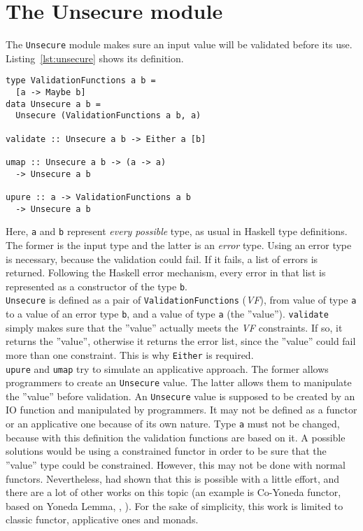 \section{The Unsecure module}\label{sec:usecure}
The \texttt{Unsecure} module makes sure an input value will be validated before its use. Listing~\ref{lst:unsecure} shows its definition.

\begin{lstlisting}[caption={Unsecure module}, label={lst:unsecure}]
type ValidationFunctions a b =
  [a -> Maybe b]
data Unsecure a b =  
  Unsecure (ValidationFunctions a b, a)
 
validate :: Unsecure a b -> Either a [b]

umap :: Unsecure a b -> (a -> a) 
  -> Unsecure a b

upure :: a -> ValidationFunctions a b
  -> Unsecure a b
\end{lstlisting}
Here, \texttt{a} and \texttt{b} represent \textit{every possible} type, as usual in Haskell type definitions. The former is the input type and the latter is an \textit{error} type. Using an error type is necessary, because the validation could fail. If it fails, a list of errors is returned. Following the Haskell error mechanism, every error in that list is represented as a constructor of the type \texttt{b}. \\
\texttt{Unsecure} is defined as a pair of \texttt{ValidationFunctions} (\textit{VF}), from value of type \texttt{a} to a value of an error type \texttt{b}, and a value of type \texttt{a} (the ''value''). \texttt{validate} simply makes sure that the ''value'' actually meets the \textit{VF} constraints. If so, it returns the ''value'', otherwise it returns the error list, since the ''value'' could fail more than one constraint. This is why \texttt{Either} is required. \\
\texttt{upure} and \texttt{umap} try to simulate an applicative approach. The former allows programmers to create an \texttt{Unsecure} value. The latter allows them to manipulate the ''value'' before validation. An \texttt{Unsecure} value is supposed to be created by an IO function and manipulated by programmers. It may not be defined as a functor or an applicative one because of its own nature. Type \texttt{a} must not be changed, because with this definition the validation functions are based on it. A possible solutions would be using a constrained functor in order to be sure that the ''value'' type could be constrained. However, this may not be done with normal functors. Nevertheless, \citeauthor{Sculthorpe:13:ConstrainedMonad} \cite{Sculthorpe:13:ConstrainedMonad} had shown that this is possible with a little effort, and there are a lot of other works on this topic (an example is Co-Yoneda functor, based on Yoneda Lemma, \cite{elkins2009calculating}, \cite{yoneda}). For the sake of simplicity, this work is limited to classic functor, applicative ones and monads. \\
